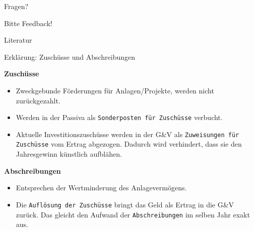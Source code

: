 \begin{frame}[standout]
    Fragen?

    Bitte Feedback!
\end{frame}

\appendix


\begin{frame}{Literatur}
    \nocite{*}
    \printbibliography[heading=none]
\end{frame}


\begin{frame}{Erklärung: Zuschüsse und Abschreibungen}

    \textbf{Zuschüsse}
    \begin{itemize}
        \item Zweckgebunde Förderungen für Anlagen/Projekte, werden nicht zurückgezahlt.
        \item Werden in der Passiva als \texttt{Sonderposten für Zuschüsse} verbucht.
        \item Aktuelle Investitionszuschüsse werden in der G\&V als \texttt{Zuweisungen für Zuschüsse} vom Ertrag abgezogen. Dadurch wird verhindert, dass sie den Jahresgewinn künstlich aufblähen.
    \end{itemize}
    
    \vspace{0.2cm}
    \textbf{Abschreibungen}
    \begin{itemize}
        \item Entsprechen der Wertminderung des Anlagevermögens.
        \item Die \texttt{Auflösung der Zuschüsse} bringt das Geld als Ertrag in die G\&V zurück. Das gleicht den Aufwand der \texttt{Abschreibungen} im selben Jahr exakt aus.
    \end{itemize}

\end{frame}